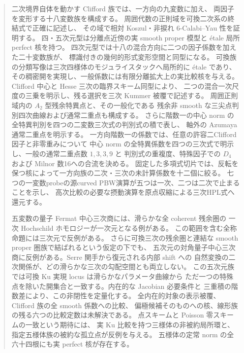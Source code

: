 \begin{abstract}
二次境界自体を動かす Clifford 族では、一方向の九変数に加え、
両因子を変形する十八変数族を構成する。
周囲代数の正則域を可換二次系の終結式で正確に記述し、
その域で相対 Koszul・非捩れ $6$-Calabi--Yau 性を証明する。
四・五次元型は分離点近傍の実 smooth proper 模型と \'etale 局所 perfect 核を持つ。
四次元型では十八の混合方向に二つの因子係数を加えた二十変数族が、
標識付きの幾何的形式変形空間と同型になる。
可換族の分類写像は三次四様体のモジュライスタックへ局所的に \'etale であり、
その稠密開を実現し、一般係数には有限分離拡大上の実比較核を与える。
Clifford 中心と Hesse 三次の臨界スキーム同型により、
二つの混合一次尺度の三乗を明示し、残る選択を三次 Kummer 被覆で記述する。
周囲正則域内の $A_2$ 型残余特異点と、その一般化である
残余非 smooth な三尖点判別四次曲線および通常二重点も構成する。
さらに階数一の中心 norm の全特異判別を四つの二変数三次式の判別式の積で表し、
軸外の Azumaya 通常二重点を明示する。
一方向階数一の係数では、任意の許容二Clifford因子と非零重みについて
中心 norm の全特異係数を四つの三次式で明示し、一般の通常二重点数 $1,3,3,9$ と
判別式の重複度、特殊因子での $D_4$ および Milnor 数16への合流を決める。
固定した多項式切片では、反転を保つ核によって一方向族の二次・三次の未計算係数を十二個に絞る。
七つの一変数probeの源curved PBW演算が五つは一次、二つは二次で止まることを示し、
高次比較の必要な摂動演算を原点収縮による三次HPL式へ還元する。

五変数の量子 Fermat 中心三次商には、滑らかな全 coherent 残余圏の
一次 Hochschild ホモロジーが一次元となる例がある。
この範囲を含む全称命題には三次元で反例がある。
さらに可換三次の残余圏と連結な smooth proper 圏族で結ばれるという仮定の下でも、
五次元の対角量子中心三次商に反例がある。Serre 関手から復元される内部 shift への
自然変換の二次関係が、どの滑らかな三次の勾配空間とも両立しない。
この五次元族では可換 Ku 実現 locus は滑らかなパラメータ曲線から
ただ一つの特殊点を除いた開集合と一致する。内在的な Jacobian 必要条件と
三重積の階数差により、この非閉性を定量化する。
全内在的対象の表示被覆、Clifford 族の全 smooth 係数への比較、
偏極候補そのものへの核、線形族の残る六つの比較定数は未解決である。
点スキームと Poisson 零スキームの一致という期待には、
実 Ku 比較を持つ三様体の非被約局所環と、指定五様体族の被約な孤立点が反例を与える。
五様体の定常 norm の全六十四根にも実 perfect 核が存在する。
\end{abstract}
\setcounter{tocdepth}{1}
\tableofcontents

